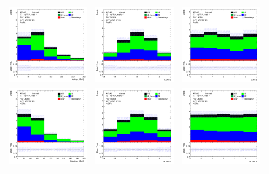 \begin{figure}[htbp]
  \begin{tabular}{ccc}

    \includegraphics[width=.3\textwidth]{figures/PreFitPlots/lep4_tWZ_4T_SF_LJet_pt.png} &
    \includegraphics[width=.3\textwidth]{figures/PreFitPlots/lep4_tWZ_4T_SF_LJet_eta.png} &
    \includegraphics[width=.3\textwidth]{figures/PreFitPlots/lep4_tWZ_4T_SF_LJet_phi.png} \\
    \includegraphics[width=.3\textwidth]{figures/PreFitPlots/lep4_tWZ_4T_SF_NLJet_pt.png} &
    \includegraphics[width=.3\textwidth]{figures/PreFitPlots/lep4_tWZ_4T_SF_NLJet_eta.png} &
    \includegraphics[width=.3\textwidth]{figures/PreFitPlots/lep4_tWZ_4T_SF_NLJet_phi.png} \\


\end{tabular}
\end{figure}
